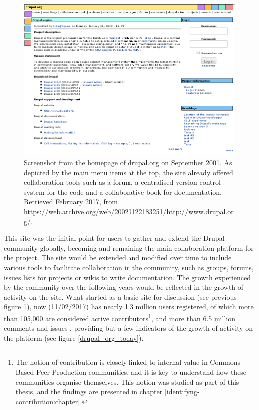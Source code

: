 \begin{figure}[H]
	\centering
	\includegraphics[scale=0.4]{img/drupal_org.png}
	\caption[Drupal.org on  September 2001]%
    {Screenshot from the homepage of drupal.org on  September 2001. As depicted by the main menu items at the top, the site already offered collaboration tools such as a forum, a centralised version control system for the code and a collaborative book for documentation. Retrieved  February 2017, from \url{https://web.archive.org/web/20020122183251/http://www.drupal.org/}.}
	\label{drupal_org}
\end{figure}

This site was the initial point for users to gather and extend the Drupal community globally, becoming and remaining the main collaboration platform for the project. The site would be extended and modified over time to include various tools to facilitate collaboration in the community, such as groups, forums, issues lists for projects or wikis to write documentation. The growth experienced by the community over the following years would be reflected in the growth of activity on the site. What started as a basic site for discussion (see previous figure \ref{drupal_org}), now (11/02/2017) has nearly 1.3 million users registered, of which more than 105,000 are considered active contributors\footnote{The notion of contribution is closely linked to internal value in Commons-Based Peer Production communities, and it is key to understand how these communities organise themselves. This notion was studied as part of this thesis, and the findings are presented in chapter \ref{identifyng-contribution:chapter}.}, and more than 6.5 million comments and issues \parencite{drupal-getting-involved:2017:Online}, providing but a few indicators of the growth of activity on the platform (see figure \ref{drupal_org_today}).

